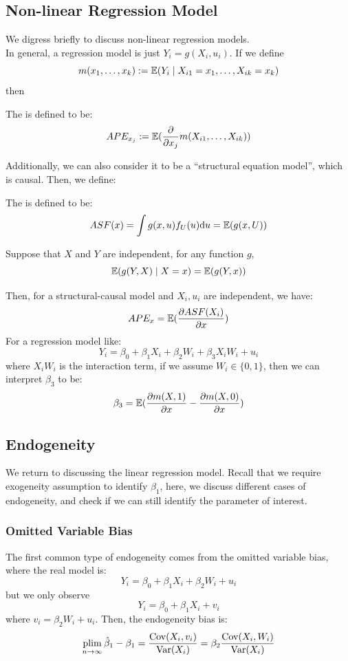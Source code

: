\subsection{Non-linear Regression Model}
We digress briefly to discuss non-linear regression models. \\
In general, a regression model is just $Y_i = g(X_i, u_i)$. If we define
$$m(x_1, \dots, x_k) := \mathbb{E}(Y_i \mid X_{i1} = x_1, \dots, X_{ik} = x_k)$$
then
\begin{definition}
    The  is defined to be:
    $$APE_{x_j} := \mathbb{E}(\pdv{x_j}m(X_{i1}, \dots, X_{ik}))$$
\end{definition}
Additionally, we can also consider it to be a ``structural equation model'', which is causal. Then, we define:
\begin{definition}
    The  is defined to be:
    $$ASF(x) = \int g(x, u)f_U(u) \dd u = \mathbb{E}(g(x, U))$$
\end{definition}
\begin{lemma}
    Suppose that $X$ and $Y$ are independent, for any function $g$,
    $$\mathbb{E}(g(Y, X) \mid X=x) = \mathbb{E}(g(Y, x))$$
\end{lemma}
Then, for a structural-causal model and $X_i, u_i$ are independent, we have:
$$APE_x = \mathbb{E}(\pdv{ASF(X_i)}{x})$$
For a regression model like:
$$Y_i = \beta_0 + \beta_1 X_i + \beta_2 W_i + \beta_3 X_iW_i + u_i$$
where $X_iW_i$ is the interaction term, if we assume $W_i \in \{0, 1\}$, then we can interpret $\beta_3$ to be:
$$\beta_3 = \mathbb{E}(\pdv{m(X, 1)}{x} - \pdv{m(X, 0)}{x})$$

\subsection{Endogeneity}
We return to discussing the linear regression model. Recall that we require exogeneity assumption to identify $\beta_1$, here, we discuss different cases of endogeneity, and check if we can still identify the parameter of interest.
\subsubsection{Omitted Variable Bias}
The first common type of endogeneity comes from the omitted variable bias, where the real model is:
$$Y_i = \beta_0 + \beta_1 X_i + \beta_2 W_i + u_i$$
but we only observe
$$Y_i = \beta_0 + \beta_1 X_i + v_i$$
where $v_i = \beta_2 W_i + u_i$. Then, the endogeneity bias is:
$$\operatorname*{plim}_{n \to \infty} \hat{\beta}_1 - \beta_1 = \frac{\text{Cov}(X_i, v_i)}{\text{Var}(X_i)} = \beta_2 \frac{\text{Cov}(X_i, W_i)}{\text{Var}(X_i)}$$

